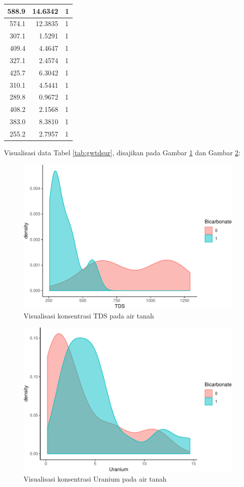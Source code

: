 \documentclass[]{book}
\begin{document}
\begin{table}[t]
\begin{tabular}{r|r|l}
588.9 & 14.6342 & 1\\
\hline
574.1 & 12.3835 & 1\\
\hline
307.1 & 1.5291 & 1\\
\hline
409.4 & 4.4647 & 1\\
\hline
327.1 & 2.4574 & 1\\
\hline
425.7 & 6.3042 & 1\\
\hline
310.1 & 4.5441 & 1\\
\hline
289.8 & 0.9672 & 1\\
\hline
408.2 & 2.1568 & 1\\
\hline
383.0 & 8.3810 & 1\\
\hline
255.2 & 2.7957 & 1\\
\hline
\end{tabular}
\end{table}

Visualisasi data Tabel \ref{tab:gwtdsur}, disajikan pada Gambar
\ref{fig:gwvis1} dan Gambar \ref{fig:gwvis2}:

\begin{figure}

{\centering \includegraphics[width=0.7\linewidth]{EnvStat_files/figure-latex/gwvis1-1} 

}

\caption{Visualisasi konsentrasi TDS pada air tanah}\label{fig:gwvis1}
\end{figure}

\begin{figure}

{\centering \includegraphics[width=0.7\linewidth]{EnvStat_files/figure-latex/gwvis2-1} 

}

\caption{Visualisasi konsentrasi Uranium pada air tanah}\label{fig:gwvis2}
\end{figure}
\end{document}
